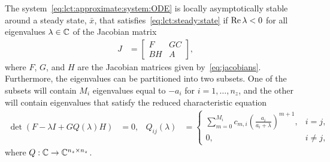 %
\begin{theorem}\label{thm:lct:stability}
	The system~\eqref{eq:lct:approximate:system:ODE} is locally asymptotically stable around a steady state, $\bar x$, that satisfies~\eqref{eq:lct:steady:state} if $\operatorname{Re} \lambda < 0$ for all eigenvalues $\lambda \in \mathbb C$ of the Jacobian matrix
	\begin{align}\label{eq:lct:ode:jacobian}
		J &=
		\begin{bmatrix}
			F & G C \\
			B H & A
		\end{bmatrix},
	\end{align}
	where $F$, $G$, and $H$ are the Jacobian matrices given by~\eqref{eq:jacobians}. Furthermore, the eigenvalues can be partitioned into two subsets. One of the subsets will contain $M_i$ eigenvalues equal to $-a_i$ for $i = 1, \ldots, n_z$, and the other will contain eigenvalues that satisfy the reduced characteristic equation
	\begin{align}\label{eq:lct:stability:characteristic:equation}
		\det(F - \lambda I + G Q(\lambda) H) &= 0, &
		Q_{ij}(\lambda) &=
		\begin{cases}
			\sum\limits_{m=0}^{M_i} c_{m, i} \left(\frac{a_i}{a_i + \lambda}\right)^{m+1}, & i = j, \\
			0, & i \neq j,
		\end{cases}
	\end{align}
	where $Q: \mathbb C \rightarrow \mathbb C^{n_z \times n_z}$.
\end{theorem}
%
